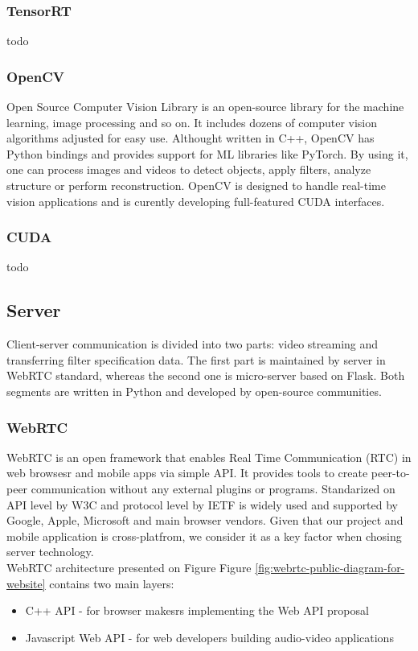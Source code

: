 \documentclass[../Main.tex]{subfiles}
\begin{document}
    \subsubsection{TensorRT}
    todo
    
    \subsubsection{OpenCV}
    Open Source Computer Vision Library is an open-source library for the machine learning, image processing and so on. It includes dozens of computer vision algorithms adjusted for easy use. Althought written in C++, OpenCV has Python bindings and provides support for ML libraries like PyTorch.  By using it, one can process images and videos to detect objects, apply filters, analyze structure or perform reconstruction. OpenCV is designed to handle real-time vision applications and is curently developing full-featured CUDA interfaces.
        
    \subsubsection{CUDA}
    todo
    
\newpage
\subsection{Server}
    Client-server communication is divided into two parts: video streaming and transferring filter specification data. The first part is maintained by server in WebRTC standard, whereas the second one is micro-server based on Flask. Both segments are written in Python and developed by open-source communities.

    \subsubsection{WebRTC}
    WebRTC is an open framework that enables Real Time Communication (RTC) in web browsesr and mobile apps via simple API. It provides tools to create peer-to-peer communication without any external plugins or programs. Standarized on API level by W3C  and protocol level by IETF  is widely used and supported by Google, Apple, Microsoft and main browser vendors. Given that our project and mobile application is cross-platfrom, we consider it as a key factor when chosing server technology. \\
    WebRTC architecture presented on Figure Figure \ref{fig:webrtc-public-diagram-for-website} contains two main layers: 
    \begin{itemize}
    \item C++ API - for browser makesrs implementing the Web API proposal
    \item Javascript Web API - for web developers building audio-video applications \\
    \end{itemize}
    
\end{document}
